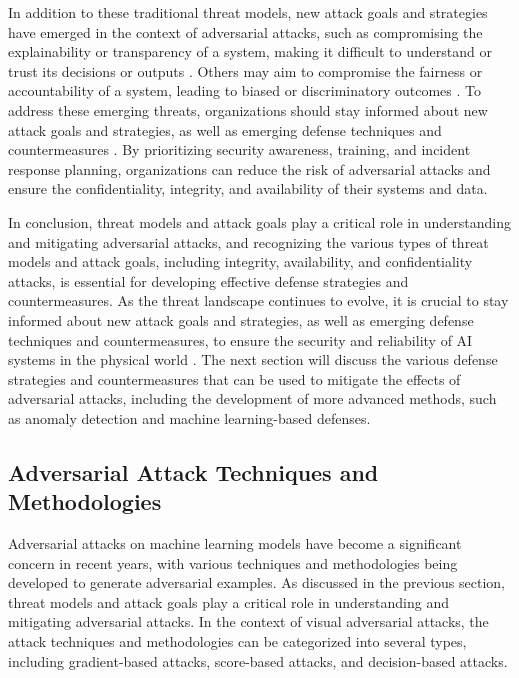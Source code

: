 \documentclass[11pt]{article}
\begin{document}
In addition to these traditional threat models, new attack goals and strategies have emerged in the context of adversarial attacks, such as compromising the explainability or transparency of a system, making it difficult to understand or trust its decisions or outputs \cite{ref46}. Others may aim to compromise the fairness or accountability of a system, leading to biased or discriminatory outcomes \cite{ref47}. To address these emerging threats, organizations should stay informed about new attack goals and strategies, as well as emerging defense techniques and countermeasures \cite{ref48}. By prioritizing security awareness, training, and incident response planning, organizations can reduce the risk of adversarial attacks and ensure the confidentiality, integrity, and availability of their systems and data.

In conclusion, threat models and attack goals play a critical role in understanding and mitigating adversarial attacks, and recognizing the various types of threat models and attack goals, including integrity, availability, and confidentiality attacks, is essential for developing effective defense strategies and countermeasures. As the threat landscape continues to evolve, it is crucial to stay informed about new attack goals and strategies, as well as emerging defense techniques and countermeasures, to ensure the security and reliability of AI systems in the physical world \cite{ref49}. The next section will discuss the various defense strategies and countermeasures that can be used to mitigate the effects of adversarial attacks, including the development of more advanced methods, such as anomaly detection and machine learning-based defenses.

\subsection{Adversarial Attack Techniques and Methodologies}

Adversarial attacks on machine learning models have become a significant concern in recent years, with various techniques and methodologies being developed to generate adversarial examples. As discussed in the previous section, threat models and attack goals play a critical role in understanding and mitigating adversarial attacks. In the context of visual adversarial attacks, the attack techniques and methodologies can be categorized into several types, including gradient-based attacks, score-based attacks, and decision-based attacks.
\end{document}
